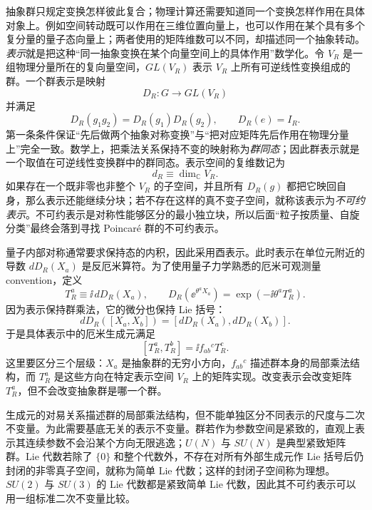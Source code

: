 抽象群只规定变换怎样彼此复合；物理计算还需要知道同一个变换怎样作用在具体对象上。例如空间转动既可以作用在三维位置向量上，也可以作用在某个具有多个复分量的量子态向量上；两者使用的矩阵维数可以不同，却描述同一个抽象转动。\emph{表示}就是把这种“同一抽象变换在某个向量空间上的具体作用”数学化。令 $V_R$ 是一组物理分量所在的复向量空间，$GL(V_R)$ 表示 $V_R$ 上所有可逆线性变换组成的群。一个群表示是映射
\begin{equation*}
 D_R:G\longrightarrow GL(V_R)
\end{equation*}
并满足
\begin{equation*}
 D_R(g_1g_2)=D_R(g_1)D_R(g_2),
 \qquad D_R(e)=I_R.
\end{equation*}
第一条条件保证“先后做两个抽象对称变换”与“把对应矩阵先后作用在物理分量上”完全一致。数学上，把乘法关系保持不变的映射称为\emph{群同态}；因此群表示就是一个取值在可逆线性变换群中的群同态。表示空间的复维数记为
\begin{equation*}
 d_R\equiv\dim_{\mathbb C}V_R.
\end{equation*}
如果存在一个既非零也非整个 $V_R$ 的子空间，并且所有 $D_R(g)$ 都把它映回自身，那么表示还能继续分块；若不存在这样的真不变子空间，就称该表示为\emph{不可约表示}。不可约表示是对称性能够区分的最小独立块，所以后面“粒子按质量、自旋分类”最终会落到寻找 Poincar\'e 群的不可约表示。

量子内部对称通常要求保持态的内积，因此采用酉表示。此时表示在单位元附近的导数 $dD_R(X_a)$ 是反厄米算符。为了使用量子力学熟悉的厄米可观测量 convention，定义
\begin{equation}
 \boxed{T_R^a\equiv \ii\,dD_R(X_a),}
 \qquad
 D_R(\ee^{\theta^aX_a})
 =\exp(-\ii\theta^aT_R^a).
 \label{eq:unitary-representation-generators-dp68}
\end{equation}
因为表示保持群乘法，它的微分也保持 Lie 括号：
\begin{equation*}
 dD_R([X_a,X_b])
 =[dD_R(X_a),dD_R(X_b)].
\end{equation*}
于是具体表示中的厄米生成元满足
\begin{equation}
 \boxed{[T_R^a,T_R^b]=\ii f_{ab}{}^{c}T_R^c.}
 \label{eq:rep-lie-algebra-dp11}
\end{equation}
这里要区分三个层级：$X_a$ 是抽象群的无穷小方向，$f_{ab}{}^c$ 描述群本身的局部乘法结构，而 $T_R^a$ 是这些方向在特定表示空间 $V_R$ 上的矩阵实现。改变表示会改变矩阵 $T_R^a$，但不会改变抽象群是哪一个群。



生成元的对易关系描述群的局部乘法结构，但不能单独区分不同表示的尺度与二次不变量。为此需要基底无关的表示不变量。群若作为参数空间是紧致的，直观上表示其连续参数不会沿某个方向无限逃逸；$U(N)$ 与 $SU(N)$ 是典型紧致矩阵群。Lie 代数若除了 $\{0\}$ 和整个代数外，不存在对所有外部生成元作 Lie 括号后仍封闭的非零真子空间，就称为简单 Lie 代数；这样的封闭子空间称为理想。$SU(2)$ 与 $SU(3)$ 的 Lie 代数都是紧致简单 Lie 代数，因此其不可约表示可以用一组标准二次不变量比较。

